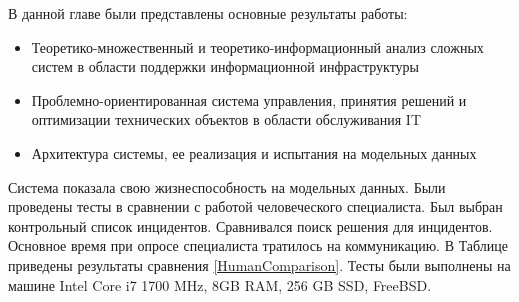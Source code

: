 В данной главе были представлены основные результаты работы:
\begin{itemize}
	\item Теоретико-множественный и теоретико-информационный анализ сложных систем в области поддержки информационной инфраструктуры
	\item Проблемно-ориентированная система управления, принятия решений и оптимизации технических объектов в области обслуживания IT
	\item Архитектура системы, ее реализация и испытания на модельных данных
\end{itemize}
Система показала свою жизнеспособность на модельных данных. Были проведены тесты в сравнении с работой человеческого специалиста. Был выбран контрольный список инцидентов. Сравнивался поиск решения для инцидентов. Основное время при опросе специалиста тратилось на коммуникацию. В Таблице приведены результаты сравнения \ref{HumanComparison}. Тесты были выполнены на машине Intel Core i7 1700 MHz, 8GB RAM, 256 GB SSD, FreeBSD. 
